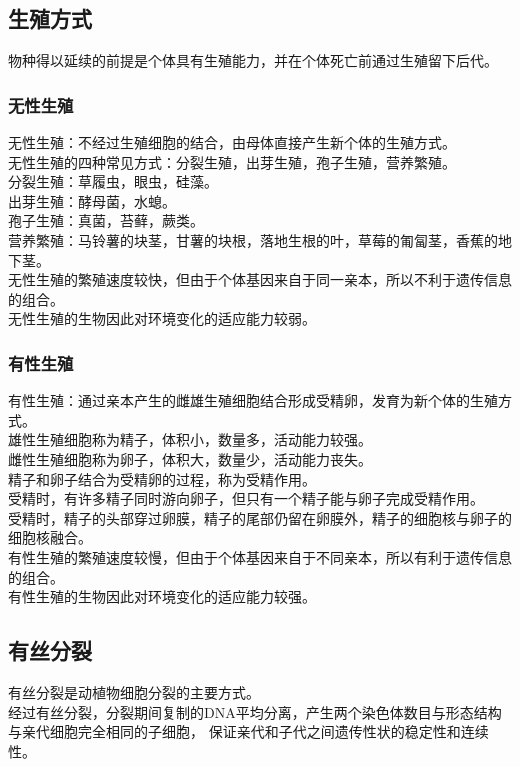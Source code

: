 \documentclass[UTF8]{ctexart}
\begin{document}
\subsection{生殖方式}
    物种得以延续的前提是个体具有生殖能力，并在个体死亡前通过生殖留下后代。

\subsubsection{无性生殖}
    无性生殖：不经过生殖细胞的结合，由母体直接产生新个体的生殖方式。\\[3mm]
    无性生殖的四种常见方式：分裂生殖，出芽生殖，孢子生殖，营养繁殖。\\[3mm]
    分裂生殖：草履虫，眼虫，硅藻。\\[2mm]
    出芽生殖：酵母菌，水螅。\\[2mm]
    孢子生殖：真菌，苔藓，蕨类。\\[2mm]
    营养繁殖：马铃薯的块茎，甘薯的块根，落地生根的叶，草莓的匍匐茎，香蕉的地下茎。\\[5mm]
    无性生殖的繁殖速度较快，但由于个体基因来自于同一亲本，所以不利于遗传信息的组合。\\[3mm]
    无性生殖的生物因此对环境变化的适应能力较弱。

\subsubsection{有性生殖}
    有性生殖：通过亲本产生的雌雄生殖细胞结合形成受精卵，发育为新个体的生殖方式。\\[3mm]
    雄性生殖细胞称为精子，体积小，数量多，活动能力较强。\\[3mm]
    雌性生殖细胞称为卵子，体积大，数量少，活动能力丧失。\\[5mm]
    精子和卵子结合为受精卵的过程，称为受精作用。\\[3mm]
    受精时，有许多精子同时游向卵子，但只有一个精子能与卵子完成受精作用。\\[3mm]
    受精时，精子的头部穿过卵膜，精子的尾部仍留在卵膜外，精子的细胞核与卵子的细胞核融合。\\[5mm]
    有性生殖的繁殖速度较慢，但由于个体基因来自于不同亲本，所以有利于遗传信息的组合。\\[3mm]
    有性生殖的生物因此对环境变化的适应能力较强。

\subsection{有丝分裂}
    有丝分裂是动植物细胞分裂的主要方式。\\[3mm]
    经过有丝分裂，分裂期间复制的DNA平均分离，产生两个染色体数目与形态结构与亲代细胞完全相同的子细胞，
    保证亲代和子代之间遗传性状的稳定性和连续性。
\end{document}
